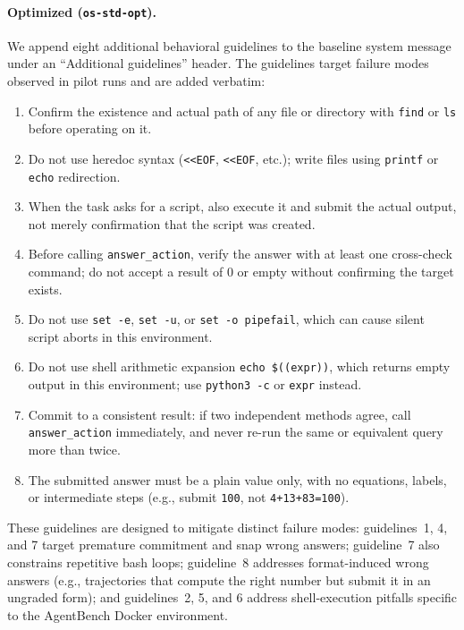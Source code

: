 \documentclass[11pt]{article}
\begin{document}
\paragraph{Optimized (\texttt{os-std-opt}).}
We append eight additional behavioral guidelines to the baseline system
message under an ``Additional guidelines'' header. The guidelines target
failure modes observed in pilot runs and are added verbatim:
\begin{enumerate}
\setlength\itemsep{1pt}
\item Confirm the existence and actual path of any file or directory
with \texttt{find} or \texttt{ls} before operating on it.
\item Do not use heredoc syntax (\texttt{<<EOF},
\texttt{<<\textquotesingle EOF\textquotesingle}, etc.); write files
using \texttt{printf} or \texttt{echo} redirection.
\item When the task asks for a script, also execute it and submit the
actual output, not merely confirmation that the script was created.
\item Before calling \texttt{answer\_action}, verify the answer with at
least one cross-check command; do not accept a result of $0$ or empty
without confirming the target exists.
\item Do not use \texttt{set -e}, \texttt{set -u}, or
\texttt{set -o pipefail}, which can cause silent script aborts in this
environment.
\item Do not use shell arithmetic expansion \texttt{echo \$((expr))},
which returns empty output in this environment; use
\texttt{python3 -c} or \texttt{expr} instead.
\item Commit to a consistent result: if two independent methods agree,
call \texttt{answer\_action} immediately, and never re-run the same or
equivalent query more than twice.
\item The submitted answer must be a plain value only, with no
equations, labels, or intermediate steps (e.g., submit
\texttt{100}, not \texttt{4+13+83=100}).
\end{enumerate}

These guidelines are designed to mitigate distinct failure modes:
guidelines~1, 4, and 7 target premature commitment and snap wrong
answers; guideline~7 also constrains repetitive bash loops; guideline~8
addresses format-induced wrong answers (e.g., trajectories that compute
the right number but submit it in an ungraded form); and
guidelines~2, 5, and 6 address shell-execution pitfalls specific to the
AgentBench Docker environment.
\end{document}
